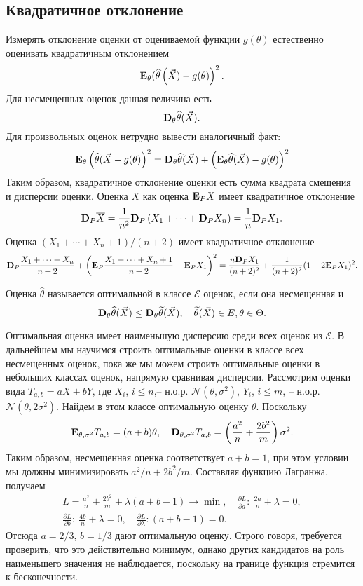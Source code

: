 \documentclass[10 pt,russian]{report}
\begin{document}
\subsection{Квадратичное отклонение}
Измерять отклонение оценки от оцениваемой функции $g(\theta)$ естественно оценивать квадратичным отклонением
$$
{\bf E}_{\theta}(\widehat{\theta}\left(\vec{X})-g(\theta)\right)^2.
$$
Для несмещенных оценок данная величина есть
$$
{\bf D}_{\theta} \widehat{\theta}(\vec{X}).
$$
Для произвольных оценок нетрудно вывести аналогичный факт:
$$
{\bf E}_{\theta}\left(\widehat{\theta}(\vec{X}-g(\theta)\right)^2 = {\bf D}_{\theta} \widehat{\theta}(\vec{X}) + \left({\bf E}_{\theta}\widehat{\theta}(\vec{X})-g(\theta)\right)^2
$$
Таким образом, квадратичное отклонение оценки есть сумма квадрата смещения и дисперсии оценки.
\Exam Оценка $\overline{X}$ как оценка ${\bf E}_P X$ имеет квадратичное отклонение
$$
{\bf D}_P \overline{X} = \frac{1}{n^2} {\bf D}_P \left(X_1 + \dotsb + {\bf D}_P X_n\right) = \frac{1}{n} {\bf D}_P X_1.
$$
Оценка $(X_1+\dotsb+X_n+1)/(n+2)$ имеет квадратичное отклонение
$$
{\bf D}_P\frac{X_1+\dotsb+X_n}{n+2} + \left({\bf E}_P\frac{X_1+\dotsb+X_n+1}{n+2}-{\bf E}_P X_1\right)^2 = 
\frac{n{\bf D}_P X_1}{(n+2)^2}+\frac{1}{(n+2)^2} (1 -2{\bf E}_PX_1)^2.
$$
\begin{Def}
Оценка $\widehat{\theta}$ называется оптимальной в классе $\mathcal{E}$ оценок, если она несмещенная и 
$$
{\bf D}_{\theta}\widehat{\theta}(\vec{X})\le {\bf D}_{\theta}\widetilde{\theta}(\vec{X}),\quad
\widetilde{\theta}(\vec{X})\in E, \theta\in\Theta.
$$
\end{Def}
Оптимальная оценка имеет наименьшую дисперсию среди всех оценок из $\mathcal{E}$. В дальнейшем мы научимся строить оптимальные оценки в классе всех несмещенных оценок, пока же мы можем строить оптимальные оценки в небольших классах оценок, напрямую сравнивая дисперсии. 
\Exam Рассмотрим оценки вида $T_{a,b} = a\overline{X}+b\overline{Y}$, где $X_i$, $i\le n$,-- н.о.р. $\mathcal{N}(\theta,\sigma^2)$, $Y_i$, $i\le m$, -- н.о.р. $\mathcal{N}(\theta,2\sigma^2)$. Найдем в этом классе оптимальную оценку $\theta$. Поскольку 
$$
{\bf E}_{\theta,\sigma^2} T_{a,b} = (a+b)\theta,\quad {\bf D}_{\theta,\sigma^2} T_{a,b} = \left(\frac{a^2}{n}+\frac{2b^2}{m}\right)\sigma^2.
$$
Таким образом, несмещенная оценка соответствует $a+b=1$, при этом условии мы должны минимизировать $a^2/n+2b^2/m$. Составляя функцию Лагранжа, получаем
\begin{eqnarray*}
L = \frac{a^2}{n}+\frac{2b^2}{m}+\lambda(a+b-1)\to \min, \quad
\frac{\partial L}{\partial a}:\ \frac{2a}{n}+\lambda = 0,\\
\frac{\partial L}{\partial b}:\ \frac{4b}{n}+\lambda = 0,\quad 
\frac{\partial L}{\partial \lambda}: (a+b-1)=0.
\end{eqnarray*}
Отсюда $a=2/3$, $b=1/3$ дают оптимальную оценку. Строго говоря, требуется проверить, что это действительно минимум, однако других кандидатов на роль наименьшего значения не наблюдается, поскольку на границе функция стремится к бесконечности.
\end{document}
